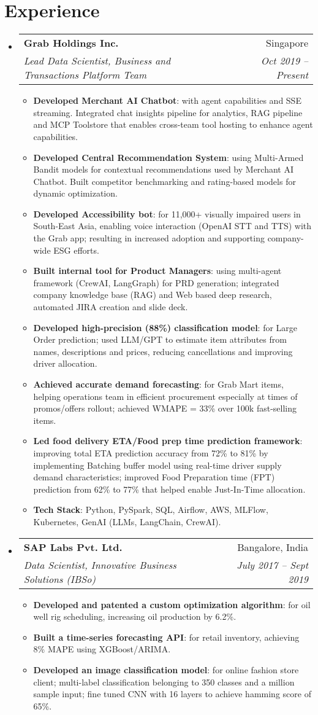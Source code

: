 \documentclass[letterpaper,11pt]{article}
\makeatletter
\newcommand{\resumeItem}[2]{
  \item\small{
    \textbf{#1}{: #2 \vspace{-2pt}}
  }
}
\newcommand{\resumeSubheading}[4]{
  \vspace{-1pt}\item
    \begin{tabular*}{0.97\textwidth}[t]{l@{\extracolsep{\fill}}r}
      \textbf{#1} & #2 \\
      \textit{\small#3} & \textit{\small #4} \\
    \end{tabular*}\vspace{-5pt}
}
\newcommand{\resumeSubHeadingListStart}{\begin{itemize}[leftmargin=*]}
\newcommand{\resumeSubHeadingListEnd}{\end{itemize}}
\newcommand{\resumeItemListStart}{\begin{itemize}}
\newcommand{\resumeItemListEnd}{\end{itemize}\vspace{-5pt}}
\makeatother
\begin{document}
\section{Experience}
  \resumeSubHeadingListStart
    \resumeSubheading
      {Grab Holdings Inc.}{Singapore}
      {Lead Data Scientist, Business and Transactions Platform Team}{Oct 2019 -- Present}
      \resumeItemListStart
        \resumeItem{Developed Merchant AI Chatbot}{with agent capabilities and SSE streaming. Integrated chat insights pipeline for analytics, RAG pipeline and MCP Toolstore that enables cross-team tool hosting to enhance agent capabilities.}
        \resumeItem{Developed Central Recommendation System}{using Multi-Armed Bandit models for contextual recommendations used by Merchant AI Chatbot. Built competitor benchmarking and rating-based models for dynamic optimization.}
        \resumeItem{Developed Accessibility bot}{for 11,000+ visually impaired users in South-East Asia, enabling voice interaction (OpenAI STT and TTS) with the Grab app; resulting in increased adoption and supporting company-wide ESG efforts.}
        \resumeItem{Built internal tool for Product Managers}{using multi-agent framework (CrewAI, LangGraph) for PRD generation; integrated company knowledge base (RAG) and Web based deep research, automated JIRA creation and slide deck.}
        \resumeItem{Developed high-precision (88\%) classification model}{for Large Order prediction; used LLM/GPT to estimate item attributes from names, descriptions and prices, reducing cancellations and improving driver allocation.}
        \resumeItem{Achieved accurate demand forecasting}{for Grab Mart items, helping operations team in efficient procurement especially at times of promos/offers rollout; achieved WMAPE = 33\% over 100k fast-selling items.}
        \resumeItem{Led food delivery ETA/Food prep time prediction framework}{improving total ETA prediction accuracy from 72\% to 81\% by implementing Batching buffer model using real-time driver supply demand characteristics; improved Food Preparation time (FPT) prediction from 62\% to 77\% that helped enable Just-In-Time allocation.}
        \resumeItem{Tech Stack}{Python, PySpark, SQL, Airflow, AWS, MLFlow, Kubernetes, GenAI (LLMs, LangChain, CrewAI).}
      \resumeItemListEnd
    \resumeSubheading
      {SAP Labs Pvt. Ltd.}{Bangalore, India}
      {Data Scientist, Innovative Business Solutions (IBSo)}{July 2017 -- Sept 2019}
      \resumeItemListStart
        \resumeItem{Developed and patented a custom optimization algorithm}{for oil well rig scheduling, increasing oil production by 6.2\%.}
        \resumeItem{Built a time-series forecasting API}{for retail inventory, achieving 8\% MAPE using XGBoost/ARIMA.}
        \resumeItem{Developed an image classification model}{for online fashion store client; multi-label classification belonging to 350 classes and a million sample input; fine tuned CNN with 16 layers to achieve hamming score of 65\%.}
      \resumeItemListEnd
  \resumeSubHeadingListEnd
\end{document}
